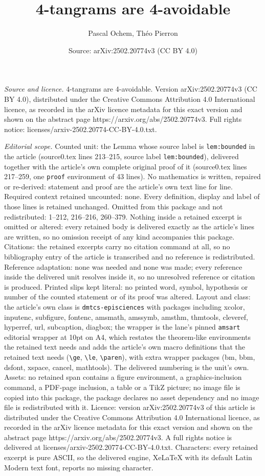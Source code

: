 \documentclass[10pt,a4paper]{amsart}
\title[4-tangrams are 4-avoidable]{4-tangrams are 4-avoidable}
\author{Pascal Ochem, Th\'eo Pierron}
\date{Source: arXiv:2502.20774v3 (CC BY 4.0)}
\begin{document}
\maketitle

\noindent\emph{Source and licence.} 4-tangrams are 4-avoidable. Version arXiv:2502.20774v3 (CC BY 4.0), distributed under the Creative Commons Attribution 4.0 International licence, as recorded in the arXiv licence metadata for this exact version and shown on the abstract page https://arxiv.org/abs/2502.20774v3. Full rights notice: licenses/arxiv-2502.20774-CC-BY-4.0.txt.\par\smallskip

\noindent\textit{Editorial scope.} Counted unit: the Lemma whose source label is \texttt{lem:bounded} in the article (source0.tex lines 213--215, source label \texttt{lem:bounded}), delivered together with the article's own complete original proof of it (source0.tex lines 217--259, one \texttt{proof} environment of 43 lines). No mathematics is written, repaired or re-derived: statement and proof are the article's own text line for line. Required context retained uncounted: none. Every definition, display and label of those lines is retained unchanged. Omitted from this package and not redistributed: 1--212, 216--216, 260--379. Nothing inside a retained excerpt is omitted or altered: every retained body is delivered exactly as the article's lines are written, so no omission receipt of any kind accompanies this package. Citations: the retained excerpts carry no citation command at all, so no bibliography entry of the article is transcribed and no reference is redistributed. Reference adaptation: none was needed and none was made; every reference inside the delivered unit resolves inside it, so no unresolved reference or citation is produced. Printed slips kept literal: no printed word, symbol, hypothesis or number of the counted statement or of its proof was altered. Layout and class: the article's own class is \texttt{dmtcs-episciences} with packages including xcolor, inputenc, subfigure, fontenc, amsmath, amssymb, amsthm, thmtools, cleveref, hyperref, url, subcaption, diagbox; the wrapper is the lane's pinned \texttt{amsart} editorial wrapper at 10pt on A4, which restates the theorem-like environments the retained text needs and adds the article's own macro definitions that the retained text needs (\texttt{\textbackslash ge}, \texttt{\textbackslash le}, \texttt{\textbackslash paren}), with extra wrapper packages (bm, bbm, dsfont, xspace, cancel, mathtools). The delivered numbering is the unit's own. Assets: no retained span contains a figure environment, a graphics-inclusion command, a PDF-page inclusion, a table or a TikZ picture; no image file is copied into this package, the package declares no asset dependency and no image file is redistributed with it. Licence: version arXiv:2502.20774v3 of this article is distributed under the Creative Commons Attribution 4.0 International licence, as recorded in the arXiv licence metadata for this exact version and shown on the abstract page https://arxiv.org/abs/2502.20774v3. A full rights notice is delivered at licenses/arxiv-2502.20774-CC-BY-4.0.txt. Characters: every retained excerpt is pure ASCII, so the delivered engine, XeLaTeX with its default Latin Modern text font, reports no missing character.
\end{document}
